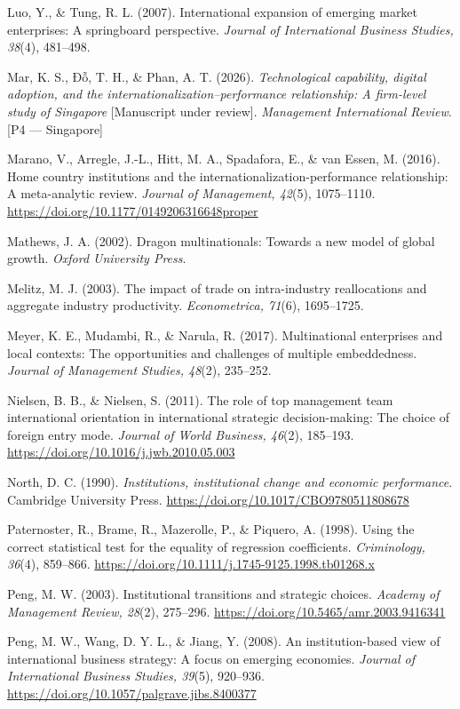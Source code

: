 \documentclass[12pt,a4paper]{article}
\begin{document}
Luo, Y., \& Tung, R. L. (2007). International expansion of emerging
market enterprises: A springboard perspective. \emph{Journal of
International Business Studies, 38}(4), 481--498.

Mar, K. S., Đỗ, T. H., \& Phan, A. T. (2026). \emph{Technological
capability, digital adoption, and the internationalization--performance
relationship: A firm-level study of Singapore} {[}Manuscript under
review{]}. \emph{Management International Review}. {[}P4 ---
Singapore{]}

Marano, V., Arregle, J.-L., Hitt, M. A., Spadafora, E., \& van Essen, M.
(2016). Home country institutions and the
internationalization-performance relationship: A meta-analytic review.
\emph{Journal of Management, 42}(5), 1075--1110.
\url{https://doi.org/10.1177/0149206316648proper}

Mathews, J. A. (2002). Dragon multinationals: Towards a new model of
global growth. \emph{Oxford University Press}.

Melitz, M. J. (2003). The impact of trade on intra-industry
reallocations and aggregate industry productivity. \emph{Econometrica,
71}(6), 1695--1725.

Meyer, K. E., Mudambi, R., \& Narula, R. (2017). Multinational
enterprises and local contexts: The opportunities and challenges of
multiple embeddedness. \emph{Journal of Management Studies, 48}(2),
235--252.

Nielsen, B. B., \& Nielsen, S. (2011). The role of top management team
international orientation in international strategic decision-making:
The choice of foreign entry mode. \emph{Journal of World Business,
46}(2), 185--193. \url{https://doi.org/10.1016/j.jwb.2010.05.003}

North, D. C. (1990). \emph{Institutions, institutional change and
economic performance}. Cambridge University Press.
\url{https://doi.org/10.1017/CBO9780511808678}

Paternoster, R., Brame, R., Mazerolle, P., \& Piquero, A. (1998). Using
the correct statistical test for the equality of regression
coefficients. \emph{Criminology, 36}(4), 859--866.
\url{https://doi.org/10.1111/j.1745-9125.1998.tb01268.x}

Peng, M. W. (2003). Institutional transitions and strategic choices.
\emph{Academy of Management Review, 28}(2), 275--296.
\url{https://doi.org/10.5465/amr.2003.9416341}

Peng, M. W., Wang, D. Y. L., \& Jiang, Y. (2008). An institution-based
view of international business strategy: A focus on emerging economies.
\emph{Journal of International Business Studies, 39}(5), 920--936.
\url{https://doi.org/10.1057/palgrave.jibs.8400377}
\end{document}
